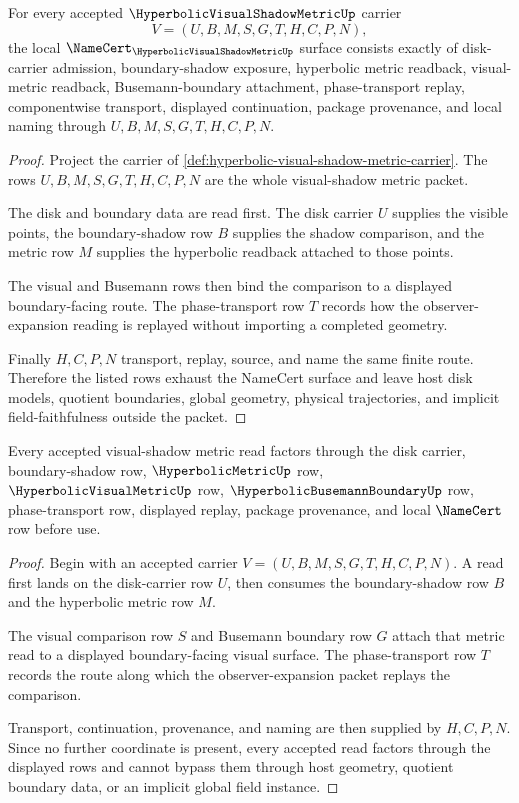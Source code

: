 \begin{theorem}
\label{thm:hyperbolic-visual-shadow-metric-namecert-obligations}
For every accepted $\HyperbolicVisualShadowMetricUp$ carrier
$$
V=(U,B,M,S,G,T,H,C,P,N),
$$
the local $\NameCert_{\HyperbolicVisualShadowMetricUp}$ surface consists exactly of disk-carrier admission, boundary-shadow exposure, hyperbolic metric readback, visual-metric readback, Busemann-boundary attachment, phase-transport replay, componentwise transport, displayed continuation, package provenance, and local naming through $U,B,M,S,G,T,H,C,P,N$.
\end{theorem}
\begin{proof}
Project the carrier of \autoref{def:hyperbolic-visual-shadow-metric-carrier}. The rows $U,B,M,S,G,T,H,C,P,N$ are the whole visual-shadow metric packet.

The disk and boundary data are read first. The disk carrier $U$ supplies the visible points, the boundary-shadow row $B$ supplies the shadow comparison, and the metric row $M$ supplies the hyperbolic readback attached to those points.

The visual and Busemann rows then bind the comparison to a displayed boundary-facing route. The phase-transport row $T$ records how the observer-expansion reading is replayed without importing a completed geometry.

Finally $H,C,P,N$ transport, replay, source, and name the same finite route. Therefore the listed rows exhaust the NameCert surface and leave host disk models, quotient boundaries, global geometry, physical trajectories, and implicit field-faithfulness outside the packet.
\end{proof}

\begin{theorem}
\label{thm:hyperbolic-visual-shadow-metric-factorization}
Every accepted visual-shadow metric read factors through the disk carrier, boundary-shadow row, $\HyperbolicMetricUp$ row, $\HyperbolicVisualMetricUp$ row, $\HyperbolicBusemannBoundaryUp$ row, phase-transport row, displayed replay, package provenance, and local $\NameCert$ row before use.
\end{theorem}
\begin{proof}
Begin with an accepted carrier $V=(U,B,M,S,G,T,H,C,P,N)$. A read first lands on the disk-carrier row $U$, then consumes the boundary-shadow row $B$ and the hyperbolic metric row $M$.

The visual comparison row $S$ and Busemann boundary row $G$ attach that metric read to a displayed boundary-facing visual surface. The phase-transport row $T$ records the route along which the observer-expansion packet replays the comparison.

Transport, continuation, provenance, and naming are then supplied by $H,C,P,N$. Since no further coordinate is present, every accepted read factors through the displayed rows and cannot bypass them through host geometry, quotient boundary data, or an implicit global field instance.
\end{proof}

